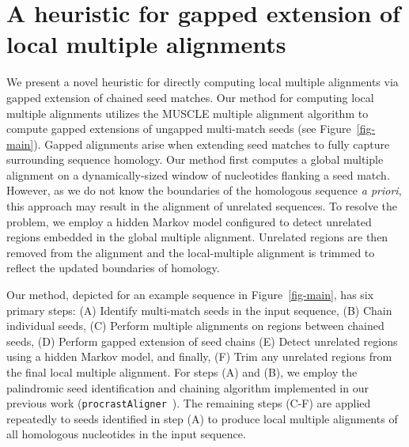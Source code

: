 \documentclass[12pt,journal,draftcls,letterpaper,onecolumn]{IEEEtran}
\begin{document}
\section{A heuristic for gapped extension of local multiple alignments}
We present a novel heuristic for directly computing local multiple alignments via gapped extension of chained seed matches. Our method for computing local multiple alignments utilizes the MUSCLE
multiple alignment algorithm to compute gapped extensions of ungapped
multi-match seeds (see Figure~\ref{fig-main}). Gapped alignments arise
when extending seed matches to fully capture surrounding sequence
homology. Our method first computes a
global multiple alignment on a dynamically-sized window of nucleotides
flanking a seed match.  However, as we do not know the boundaries of the
homologous sequence \textit{a priori}, this approach may result in the
alignment of unrelated sequences.  To resolve the problem, we employ a hidden Markov model configured to detect
unrelated regions embedded in the global multiple alignment.
Unrelated regions are then removed from the alignment and the
local-multiple alignment is trimmed to reflect the updated boundaries
of homology.

Our method, depicted for an example sequence in
Figure~\ref{fig-main}, has six primary steps: (A) Identify
multi-match seeds in the input sequence, (B) Chain individual
seeds, (C) Perform multiple alignments on regions between chained seeds, (D)
Perform gapped extension of seed chains (E) Detect unrelated regions
using a hidden Markov model, and finally, (F) Trim any unrelated regions from
the final local multiple alignment. For steps (A) and (B), we employ the palindromic seed identification
and chaining algorithm implemented in our previous work (\texttt{procrastAligner}~\cite{ref-procrast}). The remaining steps (C-F) are applied
repeatedly to seeds identified in step (A) to produce local multiple
alignments of all homologous nucleotides in the input sequence.
\end{document}
